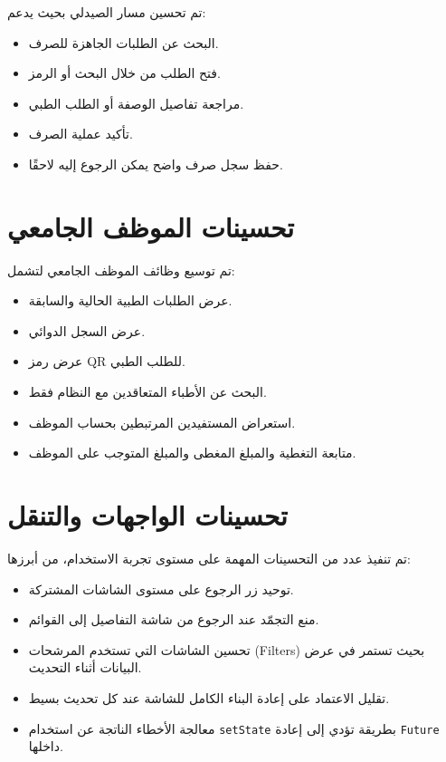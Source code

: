 \documentclass[12pt,a4paper]{report}
\begin{document}
تم تحسين مسار الصيدلي بحيث يدعم:

\begin{itemize}[itemsep=4pt]
  \item البحث عن الطلبات الجاهزة للصرف.
  \item فتح الطلب من خلال البحث أو الرمز.
  \item مراجعة تفاصيل الوصفة أو الطلب الطبي.
  \item تأكيد عملية الصرف.
  \item حفظ سجل صرف واضح يمكن الرجوع إليه لاحقًا.
\end{itemize}

\section{تحسينات الموظف الجامعي}

تم توسيع وظائف الموظف الجامعي لتشمل:

\begin{itemize}[itemsep=4pt]
  \item عرض الطلبات الطبية الحالية والسابقة.
  \item عرض السجل الدوائي.
  \item عرض رمز \textenglish{QR} للطلب الطبي.
  \item البحث عن الأطباء المتعاقدين مع النظام فقط.
  \item استعراض المستفيدين المرتبطين بحساب الموظف.
  \item متابعة التغطية والمبلغ المغطى والمبلغ المتوجب على الموظف.
\end{itemize}

\section{تحسينات الواجهات والتنقل}

تم تنفيذ عدد من التحسينات المهمة على مستوى تجربة الاستخدام، من أبرزها:

\begin{itemize}[itemsep=4pt]
  \item توحيد زر الرجوع على مستوى الشاشات المشتركة.
  \item منع التجمّد عند الرجوع من شاشة التفاصيل إلى القوائم.
  \item تحسين الشاشات التي تستخدم المرشحات (\textenglish{Filters}) بحيث تستمر في عرض البيانات أثناء التحديث.
  \item تقليل الاعتماد على إعادة البناء الكامل للشاشة عند كل تحديث بسيط.
  \item معالجة الأخطاء الناتجة عن استخدام \texttt{setState} بطريقة تؤدي إلى إعادة \texttt{Future} داخلها.
\end{itemize}
\end{document}
